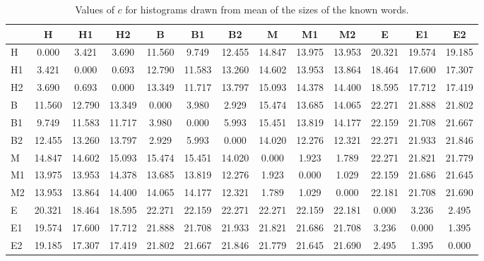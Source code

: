 \begin{table*}[h!]
\begin{center}
\begin{tabular}{| l | c | c | c | c | c | c | c | c | c | c | c | c |}\hline
 & H & H1 & H2 & B & B1 & B2 & M & M1 & M2 & E & E1 & E2 \\\hline
H & 0.000  & 3.421  & 3.690  & 11.560  & 9.749  & 12.455  & 14.847  & 13.975  & 13.953  & 20.321  & 19.574  & 19.185 \\\hline
H1 & 3.421  & 0.000  & 0.693  & 12.790  & 11.583  & 13.260  & 14.602  & 13.953  & 13.864  & 18.464  & 17.600  & 17.307 \\\hline
H2 & 3.690  & 0.693  & 0.000  & 13.349  & 11.717  & 13.797  & 15.093  & 14.378  & 14.400  & 18.595  & 17.712  & 17.419 \\\hline
B & 11.560  & 12.790  & 13.349  & 0.000  & 3.980  & 2.929  & 15.474  & 13.685  & 14.065  & 22.271  & 21.888  & 21.802 \\\hline
B1 & 9.749  & 11.583  & 11.717  & 3.980  & 0.000  & 5.993  & 15.451  & 13.819  & 14.177  & 22.159  & 21.708  & 21.667 \\\hline
B2 & 12.455  & 13.260  & 13.797  & 2.929  & 5.993  & 0.000  & 14.020  & 12.276  & 12.321  & 22.271  & 21.933  & 21.846 \\\hline
M & 14.847  & 14.602  & 15.093  & 15.474  & 15.451  & 14.020  & 0.000  & 1.923  & 1.789  & 22.271  & 21.821  & 21.779 \\\hline
M1 & 13.975  & 13.953  & 14.378  & 13.685  & 13.819  & 12.276  & 1.923  & 0.000  & 1.029  & 22.159  & 21.686  & 21.645 \\\hline
M2 & 13.953  & 13.864  & 14.400  & 14.065  & 14.177  & 12.321  & 1.789  & 1.029  & 0.000  & 22.181  & 21.708  & 21.690 \\\hline
E & 20.321  & 18.464  & 18.595  & 22.271  & 22.159  & 22.271  & 22.271  & 22.159  & 22.181  & 0.000  & 3.236  & 2.495 \\\hline
E1 & 19.574  & 17.600  & 17.712  & 21.888  & 21.708  & 21.933  & 21.821  & 21.686  & 21.708  & 3.236  & 0.000  & 1.395 \\\hline
E2 & 19.185  & 17.307  & 17.419  & 21.802  & 21.667  & 21.846  & 21.779  & 21.645  & 21.690  & 2.495  & 1.395  & 0.000 \\\hline
\end{tabular}
\caption{Values of $c$ for histograms drawn from mean of the sizes of the known words.}
\end{center}
\end{table*}
